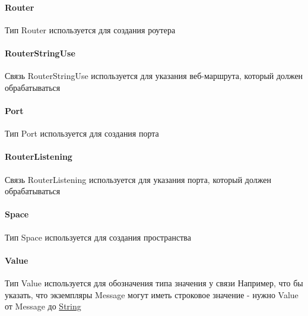 \paragraph*{Router}\hypertarget{Core.Router.Description}{}
Тип Router используется для создания роутера
\paragraph*{RouterStringUse}\hypertarget{Core.RouterStringUse.Description}{}
Связь RouterStringUse используется для
указания веб-маршрута, который должен обрабатываться
\paragraph*{Port}\hypertarget{Core.Port.Description}{}
Тип Port используется для создания порта
\paragraph*{RouterListening}\hypertarget{Core.RouterListening.Description}{}
Связь RouterListening используется для
указания порта, который должен обрабатываться
\paragraph*{Space}\hypertarget{Core.Space.Description}{}
Тип Space используется для создания пространства
\paragraph*{Value}
Тип Value используется для обозначения типа значения у связи
Например, что бы указать, что экземпляры Message могут иметь строковое значение - нужно Value от Message до \hyperlink{Core.String.Description}{String}

